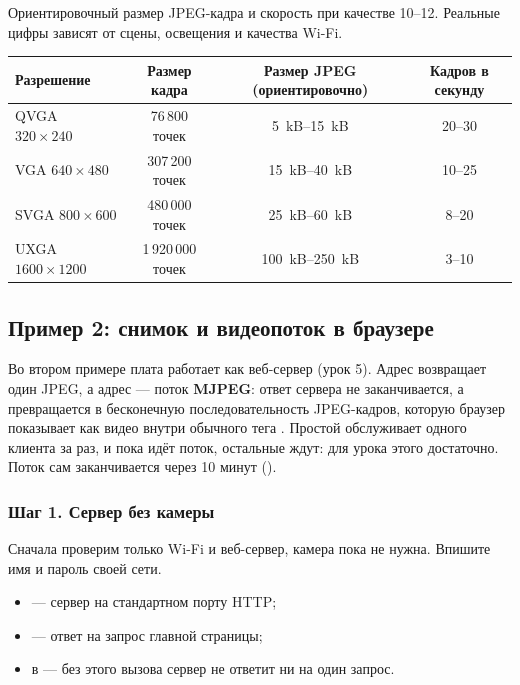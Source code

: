 Ориентировочный размер JPEG-кадра и скорость при качестве 10--12. Реальные цифры зависят от сцены,
освещения и качества Wi-Fi.

\begin{center}\small
\begin{tabular}{@{}lccc@{}}
\toprule
Разрешение & Размер кадра & Размер JPEG (ориентировочно) & Кадров в секунду \\
\midrule
QVGA $320\times240$ & 76\,800 точек & \SIrange{5}{15}{kB} & 20--30 \\
VGA $640\times480$ & 307\,200 точек & \SIrange{15}{40}{kB} & 10--25 \\
SVGA $800\times600$ & 480\,000 точек & \SIrange{25}{60}{kB} & 8--20 \\
UXGA $1600\times1200$ & 1\,920\,000 точек & \SIrange{100}{250}{kB} & 3--10 \\
\bottomrule
\end{tabular}
\end{center}

\subsection{Пример 2: снимок и видеопоток в браузере}

Во втором примере плата работает как веб-сервер (урок 5). Адрес  возвращает один JPEG,
а адрес  --- поток \textbf{MJPEG}: ответ сервера не заканчивается, а превращается в бесконечную
последовательность JPEG-кадров, которую браузер показывает как видео внутри обычного тега
. Простой  обслуживает одного клиента за раз, и пока идёт поток, остальные ждут: для урока
этого достаточно. Поток сам заканчивается через 10 минут ().

\subsubsection{Шаг 1. Сервер без камеры}

Сначала проверим только Wi-Fi и веб-сервер, камера пока не нужна. Впишите имя и пароль своей сети.


\begin{itemize}[leftmargin=*]
  \item {} --- сервер на стандартном порту HTTP;
  \item {} --- ответ на запрос главной страницы;
  \item {} в  --- без этого вызова сервер не ответит ни на один запрос.
\end{itemize}


